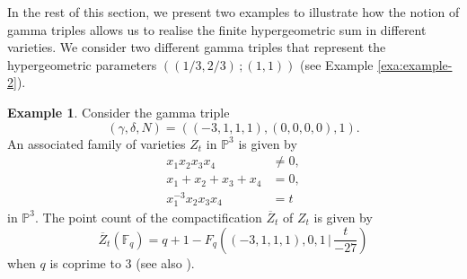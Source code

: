 \documentclass[11pt, reqno]{amsart}
\theoremstyle{plain}
\theoremstyle{definition}
\newtheorem{exa}[theo]{Example}
\newcommand{\Ps}{\mathbb{P}}
\newcommand{\F}{\mathbb{F}}
\newcommand{\ga}{\gamma}
\begin{document}
In the rest of this section, we present two examples to illustrate how the notion of gamma triples allows us to realise the finite hypergeometric sum in different varieties.  We consider two different gamma triples that represent the hypergeometric parameters $((1/3,2/3)\,;(1,1))$ (see Example \ref{exa:example-2}). 

\begin{exa}
Consider the gamma triple
\[
(\ga,\delta,N)= ((-3,1,1,1),(0,0,0,0),1).
\]
An associated family of varieties $Z_t$ in $\Ps^{3}$ is given by
\begin{align*}
x_1x_2x_3x_4 &\neq 0,\\
x_1 + x_2 + x_3 +x_4 &= 0,\\
x_1^{-3} x_2 x_3 x_4 &= t
\end{align*}
in $\Ps^{3}$. The point count of the compactification $\overline{Z}_t$ of $Z_t$ is given by 
\[
\overline{Z}_t(\F_q) = q+1 -  F_q\left((-3,1,1,1),0,1 \, \bigg| \,  \frac{t}{-27}\right)
\]
when $q$ is coprime to $3$ (see also \cite[Corollary 1.7]{BCM}).   
\end{exa}
\end{document}
